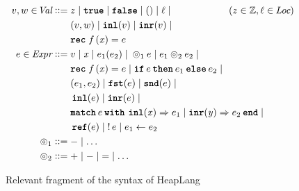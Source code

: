 \documentclass[thesis.tex]{subfiles}
\begin{document}
\begin{figure}[t]
  \begin{center}
    \begin{align*}
      \val,\valB \in \Val \bnfdef{} &
      z \mid
      \True \mid \False \mid
      \TT \mid
      \loc \mid                     \hspace*{2cm} (z \in \integer, \loc \in \Loc) \\ &
      (\val,\valB) \mid
      \Inl(\val) \mid
      \Inr(\val) \mid                                                             \\ &
      \Rec\lvarF\,(\lvar)= \expr                                                  \\
      \expr \in \Expr \bnfdef{}     &
      \val \mid
      \lvar \mid
      \expr_1(\expr_2) \mid
      {}
      \HLOp_1 \expr \mid
      \expr_1 \HLOp_2 \expr_2 \mid                                                \\ &
      \Rec\lvarF\,(\lvar)= \expr \mid
      \If \expr then \expr_1 \Else \expr_2 \mid
      {}                                                                          \\ &
      (\expr_1,\expr_2) \mid
      \Fst(\expr) \mid
      \Snd(\expr) \mid
      {}                                                                          \\ &
      \Inl(\expr) \mid
      \Inr(\expr) \mid                                                            \\ &
      \Match \expr with \Inl(\lvar) => \expr_1 | \Inr(\lvarB) => \expr_2 end \mid
      {}                                                                          \\ &
      \Alloc(\expr) \mid
      \deref \expr \mid
      \expr_1 \gets \expr_2                                                       \\
      \HLOp_1 \bnfdef{}             & - \mid \ldots                               \\
      \HLOp_2 \bnfdef{}             & + \mid - \mid \mathop{=} \mid \ldots
    \end{align*}
    \caption{Relevant fragment of the syntax of HeapLang}
    \label{fig:heaplangsyntax}
  \end{center}
\end{figure}
\end{document}
